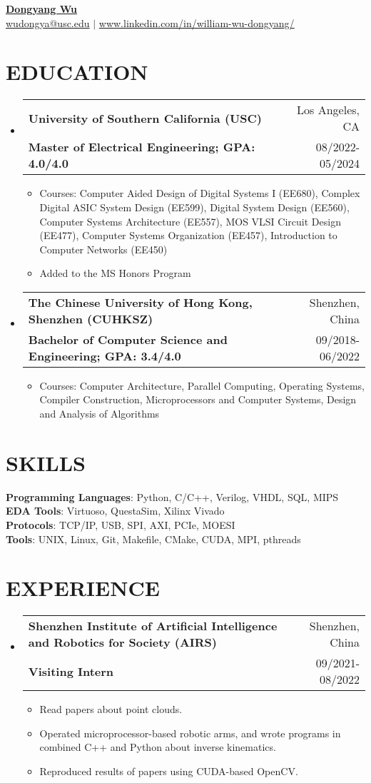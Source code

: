 \documentclass[letterpaper,11pt]{article}
\makeatletter
\newcommand{\resumeItemOne}[1]{
  \item\small{#1}
}
\newcommand{\resumeSubheading}[4]{
  \vspace{-1pt}\item
    \begin{tabular*}{0.97\textwidth}[t]{l@{\extracolsep{\fill}}r}
      \textbf{#1} & #2 \\
      \textbf{\small#3} & \small{#4} \\
    \end{tabular*}\vspace{-10pt}
}
\newcommand{\resumeSubHeadingListStart}{\begin{itemize}[leftmargin=*]}
\newcommand{\resumeSubHeadingListEnd}{\end{itemize}\vspace{-5pt}}
\newcommand{\resumeItemListStart}{\begin{itemize}}
\newcommand{\resumeItemListEnd}{\end{itemize}\vspace{-10pt}}
\makeatother
\begin{document}
\textbf{\href{https://www.linkedin.com/in/william-wu-dongyang/}{\LARGE {Dongyang Wu}}} \\
{
    \href{mailto:{wudongya@usc.edu}}{{wudongya@usc.edu}} $|$ \href{https://www.linkedin.com/in/william-wu-dongyang/}{www.linkedin.com/in/william-wu-dongyang/}
}\section{EDUCATION}
\resumeSubHeadingListStart
\resumeSubheading
    {University of Southern California (USC)}{Los Angeles, CA}
    {Master of Electrical Engineering; GPA: 4.0/4.0
}{08/2022-05/2024}
\resumeItemListStart
	\resumeItemOne{Courses: Computer Aided Design of Digital Systems I (EE680), Complex Digital ASIC System Design (EE599), Digital System Design (EE560), Computer Systems Architecture (EE557), MOS VLSI Circuit Design (EE477), Computer Systems Organization (EE457), Introduction to Computer Networks (EE450)}
	\resumeItemOne{Added to the MS Honors Program}
\resumeItemListEnd
\resumeSubheading
    {The Chinese University of Hong Kong, Shenzhen (CUHKSZ)}{Shenzhen, China}
    {Bachelor of Computer Science and Engineering; GPA: 3.4/4.0
}{09/2018-06/2022}
\resumeItemListStart
	\resumeItemOne{Courses: Computer Architecture, Parallel Computing, Operating Systems, Compiler Construction, Microprocessors and Computer Systems, Design and Analysis of Algorithms}
\resumeItemListEnd
\resumeSubHeadingListEnd



\section{SKILLS}
\textbf{Programming Languages}: Python, C/C++, Verilog, VHDL, SQL, MIPS\\ 
\textbf{EDA Tools}: Virtuoso, QuestaSim, Xilinx Vivado\\ 
\textbf{Protocols}: TCP/IP, USB, SPI, AXI, PCIe, MOESI\\ 
\textbf{Tools}: UNIX, Linux, Git, Makefile, CMake, CUDA, MPI, pthreads\\ 


\section{EXPERIENCE}
\resumeSubHeadingListStart
\resumeSubheading
    {Shenzhen Institute of Artificial Intelligence and Robotics for Society (AIRS)}{Shenzhen, China}
    {Visiting Intern}{09/2021-08/2022}
\resumeItemListStart
	\resumeItemOne{Read papers about point clouds.}
	\resumeItemOne{Operated microprocessor-based robotic arms, and wrote programs in combined C++ and Python about inverse kinematics.}
	\resumeItemOne{Reproduced results of papers using CUDA-based OpenCV.}
\resumeItemListEnd
\resumeSubHeadingListEnd
\end{document}
